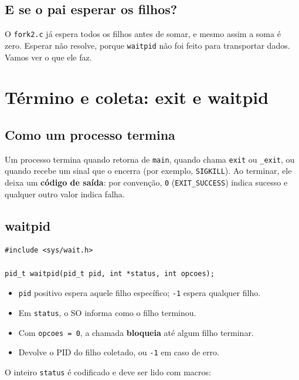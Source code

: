 \documentclass[11pt,a4paper]{article}
\newcommand{\cmd}[1]{\texttt{#1}}
\begin{document}
\subsection{E se o pai esperar os filhos?}

O \cmd{fork2.c} já espera todos os filhos antes de somar, e mesmo assim a soma é zero. Esperar não resolve, porque \cmd{waitpid} não foi feito para transportar dados. Vamos ver o que ele faz.

\section{Término e coleta: exit e waitpid}

\subsection{Como um processo termina}

Um processo termina quando retorna de \cmd{main}, quando chama \cmd{exit} ou \cmd{\_exit}, ou quando recebe um sinal que o encerra (por exemplo, \cmd{SIGKILL}). Ao terminar, ele deixa um \textbf{código de saída}: por convenção, \cmd{0} (\cmd{EXIT\_SUCCESS}) indica sucesso e qualquer outro valor indica falha.

\subsection{waitpid}

\begin{lstlisting}[style=codigo]
#include <sys/wait.h>

pid_t waitpid(pid_t pid, int *status, int opcoes);
\end{lstlisting}

\begin{itemize}
    \item \cmd{pid} positivo espera aquele filho específico; \cmd{-1} espera qualquer filho.
    \item Em \cmd{status}, o SO informa como o filho terminou.
    \item Com \cmd{opcoes = 0}, a chamada \textbf{bloqueia} até algum filho terminar.
    \item Devolve o PID do filho coletado, ou \cmd{-1} em caso de erro.
\end{itemize}

O inteiro \cmd{status} é codificado e deve ser lido com macros:
\end{document}
